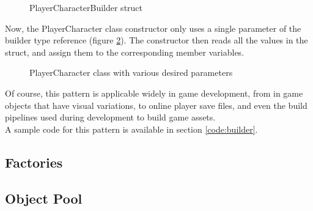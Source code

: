 \documentclass[10pt,letterpaper]{article}
\newcommand{\bs}{\bigskip}
\begin{document}
\begin{multicols}{2}
\begin{figure}[H]
	\centering


	\caption{PlayerCharacterBuilder struct}
	\label{fig:playercharacter-builder}
\end{figure}

Now, the PlayerCharacter class constructor only uses a single parameter of the builder type reference (figure \ref{fig:playercharacter-2}). The constructor then reads all the values in the struct, and assign them to the corresponding member variables.

\begin{figure}[H]
	\centering


	\caption{PlayerCharacter class with various desired parameters}
	\label{fig:playercharacter-2}
\end{figure}

Of course, this pattern is applicable widely in game development, from in game objects that have visual variations, to online player save files, and even the build pipelines used during development to build game assets.\bs
\\
A sample code for this pattern is available in section \ref{code:builder}.

\subsection{Factories}

\subsection{Object Pool}


\end{multicols}
\end{document}
